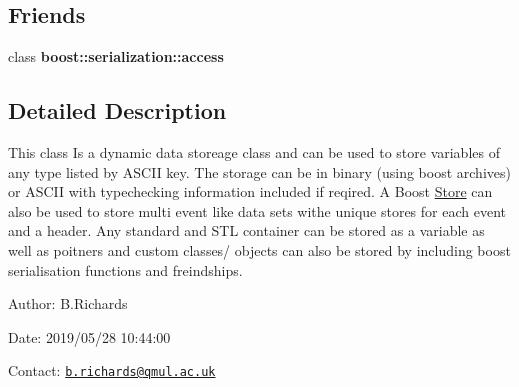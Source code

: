 \subsection*{Friends}
\begin{DoxyCompactItemize}
\item 
\hypertarget{classBoostStore_ac98d07dd8f7b70e16ccb9a01abf56b9c}{class {\bfseries boost\-::serialization\-::access}}\label{classBoostStore_ac98d07dd8f7b70e16ccb9a01abf56b9c}

\end{DoxyCompactItemize}


\subsection{Detailed Description}
This class Is a dynamic data storeage class and can be used to store variables of any type listed by A\-S\-C\-I\-I key. The storage can be in binary (using boost archives) or A\-S\-C\-I\-I with typechecking information included if reqired. A Boost \hyperlink{classStore}{Store} can also be used to store multi event like data sets withe unique stores for each event and a header. Any standard and S\-T\-L container can be stored as a variable as well as poitners and custom classes/ objects can also be stored by including boost serialisation functions and freindships.

\begin{DoxyParagraph}{Author\-:}
B.\-Richards 
\end{DoxyParagraph}
\begin{DoxyParagraph}{Date\-:}
2019/05/28 10\-:44\-:00 
\end{DoxyParagraph}
Contact\-: \href{mailto:b.richards@qmul.ac.uk}{\tt b.\-richards@qmul.\-ac.\-uk} 

